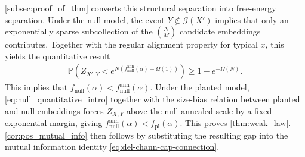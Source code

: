 \documentclass[11pt]{amsart}
\numberwithin{equation}{section}
\numberwithin{equation}{section}
\newcommand{\1}{\mathbbm{1}}
\newcommand{\Prob}{\mathbb{P}}
\newcommand{\fpl}{f_{\mathrm{pl}}}
\newcommand{\fnullann}{f_{\mathrm{null}}^{\mathrm{ann}}}
\theoremstyle{definition}
\begin{document}
\cref{subsec:proof_of_thm} converts this structural separation into free-energy separation. Under the null model, the event $Y \notin \mathcal G(X')$ implies that only an exponentially sparse subcollection of the $\binom{N}{M}$ candidate embeddings contributes. Together with the regular alignment property for typical $x$, this yields the quantitative result
\begin{align} \label{eq:null_quantitative_intro}
    \Prob\left( Z_{X', Y} < e^{N\left( \fnullann(\alpha) - \Omega(1) \right)} \right) \geq 1 - e^{-\Omega(N)}.
\end{align}
This implies that $f_{\mathrm{null}}(\alpha) < f_{\mathrm{null}}^{\mathrm{ann}}(\alpha)$. Under the planted model, \eqref{eq:null_quantitative_intro} together with the size-bias relation between planted and null embeddings forces $Z_{X,Y}$ above the null annealed scale by a fixed exponential margin, giving $\fnullann(\alpha) < \fpl(\alpha)$. This proves \cref{thm:weak_law}. \cref{cor:pos_mutual_info} then follows by substituting the resulting gap into the mutual information identity \eqref{eq:del-chann-cap-connection}.
\end{document}

